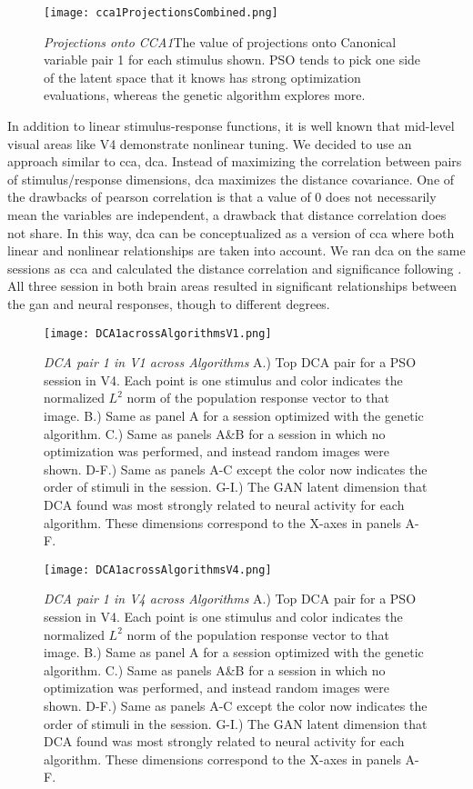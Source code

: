 \begin{figure}
	\centering
	\texttt{[image: cca1ProjectionsCombined.png]}
	{\caption{{\it Projections onto CCA1}The value of projections onto Canonical variable pair 1 for each stimulus shown. PSO tends to pick one side of the latent space that it knows has strong optimization evaluations, whereas the genetic algorithm explores more.}
	\label{fig:ccaProjections}}
\end{figure}

 In addition to linear stimulus-response functions, it is well known that mid-level visual areas like V4 demonstrate nonlinear tuning. We decided to use an approach similar to \gls{cca}, \gls{dca}. Instead of maximizing the correlation between pairs of stimulus/response dimensions, \gls{dca} maximizes the distance covariance. One of the drawbacks of pearson correlation is that a value of 0 does not necessarily mean the variables are independent, a drawback that distance correlation does not share. In this way, \gls{dca} can be conceptualized as a version of \gls{cca} where both linear and nonlinear relationships are taken into account. We ran \gls{dca} on the same sessions as \gls{cca} and calculated the distance correlation and significance following \cite{Shen2022}. All three session in both brain areas resulted in significant relationships between the \gls{gan} and neural responses, though to different degrees.
 
\begin{figure}
	\centering
	\texttt{[image: DCA1acrossAlgorithmsV1.png]}
	{\caption{{\it DCA pair 1 in V1 across Algorithms} A.) Top DCA pair for a PSO session in V4. Each point is one stimulus and color indicates the normalized $L^2$ norm of the population response vector to that image. B.) Same as panel A for a session optimized with the genetic algorithm. C.) Same as panels A\&B for a session in which no optimization was performed, and instead random images were shown. D-F.) Same as panels A-C except the color now indicates the order of stimuli in the session. G-I.) The GAN latent dimension that DCA found was most strongly related to neural activity for each algorithm. These dimensions correspond to the X-axes in panels A-F.}
	\label{fig:dca1V1}}
\end{figure}


\begin{figure}
	\centering
	\texttt{[image: DCA1acrossAlgorithmsV4.png]}
	{\caption{{\it DCA pair 1 in V4 across Algorithms} A.) Top DCA pair for a PSO session in V4. Each point is one stimulus and color indicates the normalized $L^2$ norm of the population response vector to that image. B.) Same as panel A for a session optimized with the genetic algorithm. C.) Same as panels A\&B for a session in which no optimization was performed, and instead random images were shown. D-F.) Same as panels A-C except the color now indicates the order of stimuli in the session. G-I.) The GAN latent dimension that DCA found was most strongly related to neural activity for each algorithm. These dimensions correspond to the X-axes in panels A-F.}
	\label{fig:dca1V4}}
\end{figure}

